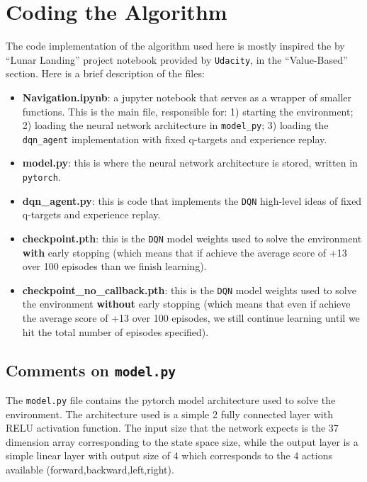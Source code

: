 \documentclass[
]{article}
\begin{document}
\pagebreak

\hypertarget{coding-the-algorithm}{%
\section{Coding the Algorithm}\label{coding-the-algorithm}}

The code implementation of the algorithm used here is mostly inspired
the by ``Lunar Landing'' project notebook provided by \texttt{Udacity},
in the ``Value-Based'' section. Here is a brief description of the
files:

\begin{itemize}
\item
  \textbf{Navigation.ipynb}: a jupyter notebook that serves as a wrapper
  of smaller functions. This is the main file, responsible for: 1)
  starting the environment; 2) loading the neural network architecture
  in \texttt{model\_py}; 3) loading the \texttt{dqn\_agent}
  implementation with fixed q-targets and experience replay.
\item
  \textbf{model.py}: this is where the neural network architecture is
  stored, written in \texttt{pytorch}.
\item
  \textbf{dqn\_agent.py}: this is code that implements the \texttt{DQN}
  high-level ideas of fixed q-targets and experience replay.
\item
  \textbf{checkpoint.pth}: this is the \texttt{DQN} model weights used
  to solve the environment \textbf{with} early stopping (which means
  that if achieve the average score of +13 over 100 episodes than we
  finish learning).
\item
  \textbf{checkpoint\_no\_callback.pth}: this is the \texttt{DQN} model
  weights used to solve the environment \textbf{without} early stopping
  (which means that even if achieve the average score of +13 over 100
  episodes, we still continue learning until we hit the total number of
  episodes specified).
\end{itemize}

\hypertarget{comments-on-model.py}{%
\subsection{\texorpdfstring{Comments on
\texttt{model.py}}{Comments on model.py}}\label{comments-on-model.py}}

The \texttt{model.py} file contains the pytorch model architecture used
to solve the environment. The architecture used is a simple 2 fully
connected layer with RELU activation function. The input size that the
network expects is the 37 dimension array corresponding to the state
space size, while the output layer is a simple linear layer with output
size of 4 which corresponds to the 4 actions available
(forward,backward,left,right).
\end{document}
